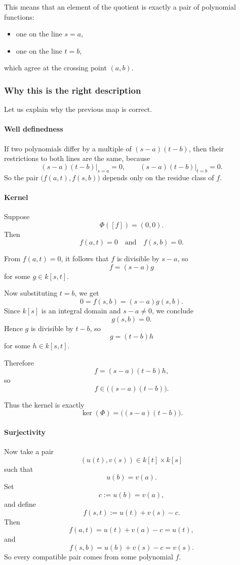 \documentclass[12pt,a4paper]{article}
\theoremstyle{notespace}
\theoremstyle{definition}
\begin{document}
This means that an element of the quotient is exactly a pair of polynomial functions:

\begin{itemize}
	\item one on the line \(s=a\),
	\item one on the line \(t=b\),
\end{itemize}

which agree at the crossing point \((a,b)\).

\subsubsection{Why this is the right description}

Let us explain why the previous map is correct.

\paragraph{Well definedness}

If two polynomials differ by a multiple of \((s-a)(t-b)\), then their restrictions to both lines are the same, because
\[
(s-a)(t-b)\big|_{s=a}=0,
\qquad
(s-a)(t-b)\big|_{t=b}=0.
\]
So the pair \(\bigl(f(a,t),f(s,b)\bigr)\) depends only on the residue class of \(f\).

\paragraph{Kernel}

Suppose
\[
\Phi([f])=(0,0).
\]
Then
\[
f(a,t)=0
\quad\text{and}\quad
f(s,b)=0.
\]

From \(f(a,t)=0\), it follows that \(f\) is divisible by \(s-a\), so
\[
f=(s-a)g
\]
for some \(g\in k[s,t]\).

Now substituting \(t=b\), we get
\[
0=f(s,b)=(s-a)g(s,b).
\]
Since \(k[s]\) is an integral domain and \(s-a\neq 0\), we conclude
\[
g(s,b)=0.
\]
Hence \(g\) is divisible by \(t-b\), so
\[
g=(t-b)h
\]
for some \(h\in k[s,t]\).

Therefore
\[
f=(s-a)(t-b)h,
\]
so
\[
f\in \bigl((s-a)(t-b)\bigr).
\]

Thus the kernel is exactly
\[
\ker(\Phi)=\bigl((s-a)(t-b)\bigr).
\]

\paragraph{Surjectivity}

Now take a pair
\[
(u(t),v(s))\in k[t]\times k[s]
\]
such that
\[
u(b)=v(a).
\]
Set
\[
c:=u(b)=v(a),
\]
and define
\[
f(s,t):=u(t)+v(s)-c.
\]
Then
\[
f(a,t)=u(t)+v(a)-c=u(t),
\]
and
\[
f(s,b)=u(b)+v(s)-c=v(s).
\]
So every compatible pair comes from some polynomial \(f\).
\end{document}
